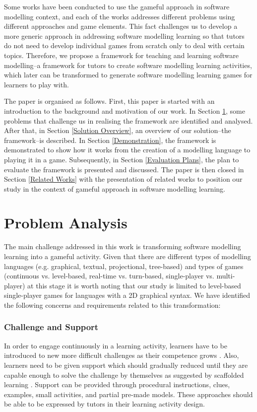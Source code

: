 \documentclass[conference]{IEEEtran}
\begin{document}
Some works \cite{Stikkolorum2014, Groenewegen2010, Ionita2015, Richardsen2014} have been conducted to use the gameful approach in software modelling context, and each of the works addresses different problems using different approaches and game elements. This fact challenges us to develop a more generic approach in addressing software modelling learning so that tutors do not need to develop individual games from scratch only to deal with certain topics. Therefore, we propose a framework for teaching and learning software modelling--a framework for tutors to create software modelling learning activities, which later can be transformed to generate software modelling learning games for learners to play with.

The paper is organised as follows. First, this paper is started with an introduction to the background and motivation of our work. In Section \ref{Problem Analysis}, some problems that challenge us in realising the framework are identified and analysed. After that, in Section \ref{Solution Overview}, an overview of our solution--the framework--is described. In Section \ref{Demonstration}, the framework is demonstrated to show how it works from the creation of a modelling language to playing it in a game. Subsequently, in Section \ref{Evaluation Plans}, the plan to evaluate the framework is presented and discussed. The paper is then closed in Section \ref{Related Works} with the presentation of related works to position our study in the context of gameful approach in software modelling learning. 

\section{Problem Analysis}
\label{Problem Analysis}
The main challenge addressed in this work is transforming software modelling learning into a gameful activity. Given that there are different types of modelling languages (e.g. graphical, textual, projectional, tree-based) and types of games (continuous vs. level-based, real-time vs. turn-based, single-player vs. multi-player) at this stage it is worth noting that our study is limited to level-based single-player games for languages with a 2D graphical syntax. We have identified the following concerns and requirements related to this transformation:

\subsubsection{Challenge and Support}
In order to engage continuously in a learning activity, learners have to be introduced to new more difficult challenges as their competence grows \cite{csikszentmihalyi2014toward}. Also, learners need to be given support which should gradually reduced until they are capable enough to solve the challenge by themselves as suggested by scaffolded learning \cite{wood1976role, vygotsky1978mind}. Support can be provided through procedural instructions, clues, examples, small activities, and partial pre-made models. These approaches should be able to be expressed by tutors in their learning activity design. 
\end{document}
